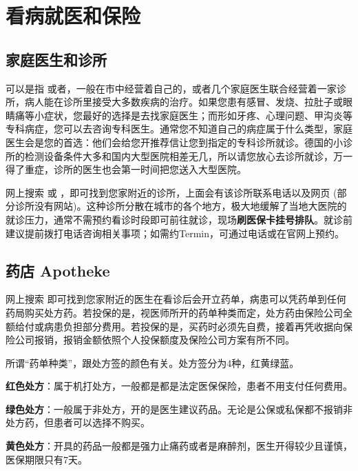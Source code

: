 \section{看病就医和保险}\label{sec:看病就医和保险}

  \subsection{家庭医生和诊所}\label{subsec:家庭医生和诊所}

     可以是指 或者，一般在市中经营着自己的，或者几个家庭医生联合经营着一家诊所，病人能在诊所里接受大多数疾病的治疗。如果您患有感冒、发烧、拉肚子或眼睛痛等小症状，您最好的选择是去找家庭医生；而形如牙疼、心理问题、甲沟炎等专科病症，您可以去咨询专科医生。通常您不知道自己的病症属于什么类型，家庭医生会是您的首选：他们会给您开推荐信让您到指定的专科诊所就诊。德国的小诊所的检测设备条件大多和国内大型医院相差无几，所以请您放心去诊所就诊，万一得了重症，诊所的医生也会第一时间把您送入大型医院。

    网上搜索 或 ，即可找到您家附近的诊所，上面会有该诊所联系电话以及网页 (部分诊所没有网站)。这种诊所分散在城市的各个地方，极大地缓解了当地大医院的就诊压力，通常不需预约看诊时段即可前往就诊，现场\textbf{刷医保卡挂号排队}。就诊前建议提前拨打电话咨询相关事项；如需约Termin，可通过电话或在官网上预约。

  \subsection{药店 Apotheke}\label{subsec:药店 Apotheke}

    网上搜索  即可找到您家附近的医生在看诊后会开立药单，病患可以凭药单到任何药局购买处方药。若投保的是，视医师所开的药单种类而定，处方药由保险公司全额给付或病患负担部分费用。若投保的是，买药时必须先自费，接着再凭收据向保险公司报销，报销金额依照个人投保额度及保险公司方案有所不同。

    所谓``药单种类''，跟处方签的颜色有关。处方签分为4种，红黄绿蓝。

    \textbf{红色处方}：属于机打处方，一般都是都是法定医保保险，患者不用支付任何费用。

    \textbf{绿色处方}：一般属于非处方，开的是医生建议药品。无论是公保或私保都不报销非处方药，但患者可以选择不购买。

    \textbf{黄色处方}：开具的药品一般都是强力止痛药或者是麻醉剂，医生开得较少且谨慎，医保期限只有7天。

